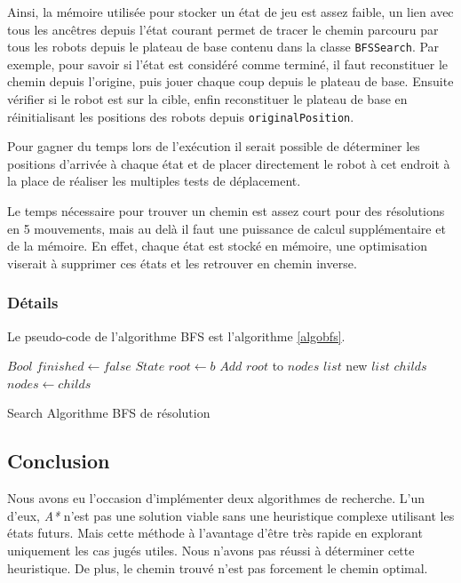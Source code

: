 \documentclass[a4paper]{article} %
\begin{document}
Ainsi, la mémoire utilisée pour stocker un état de jeu est assez faible, un lien avec tous les ancêtres depuis l'état courant permet de tracer le chemin parcouru par tous les robots depuis le plateau de base contenu dans la classe \texttt{BFSSearch}. Par exemple, pour savoir si l'état est considéré comme terminé, il faut reconstituer le chemin depuis l'origine, puis jouer chaque coup depuis le plateau de base. Ensuite vérifier si le robot est sur la cible, enfin reconstituer le plateau de base en réinitialisant les positions des robots depuis \texttt{originalPosition}.

Pour gagner du temps lors de l’exécution il serait possible de déterminer les positions d'arrivée à chaque état et de placer directement le robot à cet endroit à la place de réaliser les multiples tests de déplacement.

Le temps nécessaire pour trouver un chemin est assez court pour des résolutions en 5 mouvements, mais au delà il faut une puissance de calcul supplémentaire et de la mémoire. En effet, chaque état est stocké en mémoire, une optimisation viserait à supprimer ces états et les retrouver en chemin inverse.

		\subsubsection{Détails}
Le pseudo-code de l'algorithme BFS est l'algorithme \ref{algobfs}.

\begin{algorithm}
\DontPrintSemicolon
\SetAlgoVlined
{}
$Bool$  $finished \gets false$\;
$State$  $root \gets b$\;
$Add$ $root$ to $nodes$ $list$\; 
 {
	new $list$ $childs$\;
	$nodes \gets childs$\;
}
\;
\caption{{\sc Search} Algorithme BFS de résolution}
\label{algobfs}
\end{algorithm}

	\subsection{Conclusion}
Nous avons eu l'occasion d'implémenter deux algorithmes de recherche. L'un d'eux, \textsl{A*} n'est pas une solution viable sans une heuristique complexe utilisant les états futurs. Mais cette méthode à l'avantage d'être très rapide en explorant uniquement les cas jugés utiles. Nous n'avons pas réussi à déterminer cette heuristique. De plus, le chemin trouvé n'est pas forcement le chemin optimal.
\end{document}
